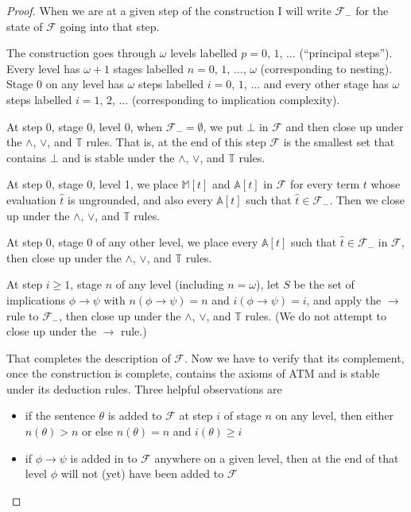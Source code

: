 \documentclass[10pt,a4paper]{amsart}
\begin{document}
\begin{proof}
  When we are at a given step of the construction I will write $\mathcal{F}_-$ for the state of $\mathcal{F}$ going
  into that step.

  The construction goes through $\omega$ levels labelled $p = 0$, $1$, $\ldots$ (``principal steps''). Every level has
  $\omega + 1$ stages labelled $n = 0$, $1$, $\ldots$, $\omega$ (corresponding to nesting). Stage $0$ on any level has $\omega$
  steps labelled $i = 0$, $1$, $\ldots$ and every other stage has $\omega$ steps labelled $i = 1$, $2$, $\ldots$ (corresponding
to implication
  complexity).

  At step 0, stage 0, level 0, when $\mathcal{F}_- = \emptyset$, we put $\bot$ in $\mathcal{F}$ and then close up
  under the $\wedge$, $\vee$, and $\mathbb{T}$ rules. That is, at the end of this step $\mathcal{F}$ is the smallest
  set that contains $\bot$ and is stable under the $\wedge$, $\vee$, and $\mathbb{T}$ rules.

  At step 0, stage 0, level 1, we place $\mathbb{M}[t]$ and $\mathbb{A}[t]$ in $\mathcal{F}$ for every term $t$
  whose evaluation $\hat{t}$ is ungrounded, and also every $\mathbb{A}[t]$ such that $\hat{t} \in \mathcal{F}_-$.
  Then we close up under the $\wedge$, $\vee$, and $\mathbb{T}$ rules.

  At step 0, stage 0 of any other level, we place every $\mathbb{A}[t]$ such that $\hat{t} \in \mathcal{F}_-$
  in $\mathcal{F}$, then close up under the $\wedge$, $\vee$, and $\mathbb{T}$ rules.

  At step $i \geq 1$, stage $n$ of any level (including $n = \omega$), let $S$ be the set of implications $\phi \to \psi$ with
  $n(\phi \to \psi) = n$ and $i(\phi \to \psi) = i$, and apply the $\to$ rule to $\mathcal{F}_-$, then
  close up under the $\wedge$, $\vee$, and $\mathbb{T}$ rules. (We do not attempt to close up under the $\to$ rule.)

  That completes the description of $\mathcal{F}$. Now we have to verify that its complement, once the construction is complete, contains the axioms of ATM and is stable under its deduction rules. Three helpful observations are

  \begin{itemize}
  \item if the sentence $\theta$ is added to $\mathcal{F}$ at step $i$ of stage $n$ on any level, then either
    $n(\theta) > n$ or else $n(\theta) = n$ and $i(\theta) \geq i$

  \item if $\phi \to \psi$ is added in to $\mathcal{F}$ anywhere on a given level, then at the end of that level
    $\phi$ will not (yet) have been added to $\mathcal{F}$


\end{itemize}
\end{proof}
\end{document}
